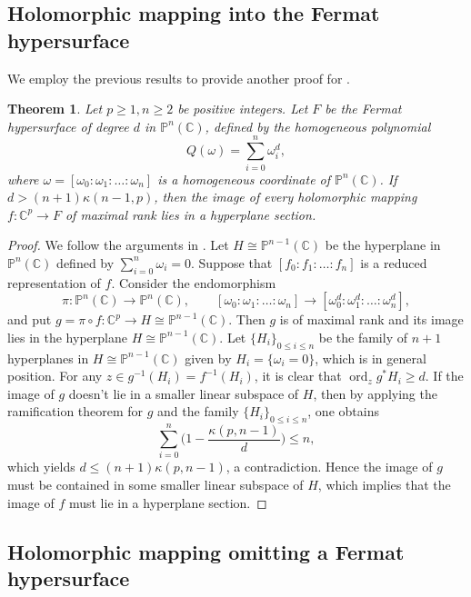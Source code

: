 \documentclass[english, 12pt]{amsart}
\DeclareMathOperator{\ord}{ord}
\theoremstyle{plain}
\newtheorem{thm}{Theorem}[section]
\theoremstyle{remark}
\numberwithin{equation}{section}
\theoremstyle{plain}
\theoremstyle{named}
\begin{document}
\subsection{Holomorphic mapping into the Fermat hypersurface}
We employ the previous results to provide another proof for \cite[Theorem 2.2.2]{Etesse2023}.
\begin{thm}
\label{degeneracy of holomorphic mapping into fermat hypersurface}
Let $p\geq 1,n\geq2$ be positive integers. Let $F$ be the Fermat hypersurface of degree $d$ in $\mathbb{P}^n(\mathbb{C})$, defined by the homogeneous polynomial 
$$
Q(\omega)=\sum_{i=0}^n\omega_i^d,
$$
where $\omega=[\omega_0:\omega_1:\dots:\omega_n]$ is a homogeneous coordinate of $\mathbb{P}^n(\mathbb{C})$.
If $d>(n+1)\kappa(n-1,p)$, then the image of every holomorphic mapping $f\colon\mathbb{C}^p\rightarrow F$ of maximal rank lies in a hyperplane section.
\end{thm}
\begin{proof} We follow the arguments in \cite[Example 3.10.21]{Kob98}.
Let $H\cong\mathbb{P}^{n-1}(\mathbb{C})$ be the hyperplane in $\mathbb{P}^n(\mathbb{C})$ defined by $\sum_{i=0}^{n}\omega_i=0$. Suppose that $[f_0:f_1:\dots:f_n]$ is a reduced representation of $f$. Consider the endomorphism $$\pi\colon\mathbb{P}^n(\mathbb{C})\rightarrow\mathbb{P}^n(\mathbb{C}),\qquad [\omega_0:\omega_1:\dots:\omega_n]\rightarrow [\omega_0^d:\omega_1^d:\dots:\omega_n^d],
$$
and put $g=\pi\circ f\colon\mathbb{C}^p\rightarrow H\cong\mathbb{P}^{n-1}(\mathbb{C})$. Then $g$ is of maximal rank and its image lies in the hyperplane $H\cong\mathbb{P}^{n-1}(\mathbb{C})$. Let $\{H_i\}_{0\leq i\leq n}$ be the family of $n+1$ hyperplanes in $H\cong\mathbb{P}^{n-1}(\mathbb{C})$ given by $H_i=\{\omega_i=0\}$, which is in general position. For any $z\in g^{-1}(H_i)=f^{-1}(H_i)$, it is clear that $\ord_zg^*H_i\geq d$. If the image of $g$ doesn't lie in a smaller linear subspace of $H$, then by applying the ramification theorem for $g$ and the family $\{H_i\}_{0\leq i\leq n}$, one obtains
\[
\sum_{i=0}^{n}\bigg(1-\dfrac{\kappa(p,n-1)}{d}\bigg)\leq n,
\]
which yields $d\leq (n+1)\kappa(p,n-1)$, a contradiction. Hence the image of $g$ must be contained in some smaller linear subspace of $H$, which implies that the image of $f$ must lie in a hyperplane section.
\end{proof}	



\subsection{Holomorphic mapping omitting a Fermat hypersurface}
\end{document}
